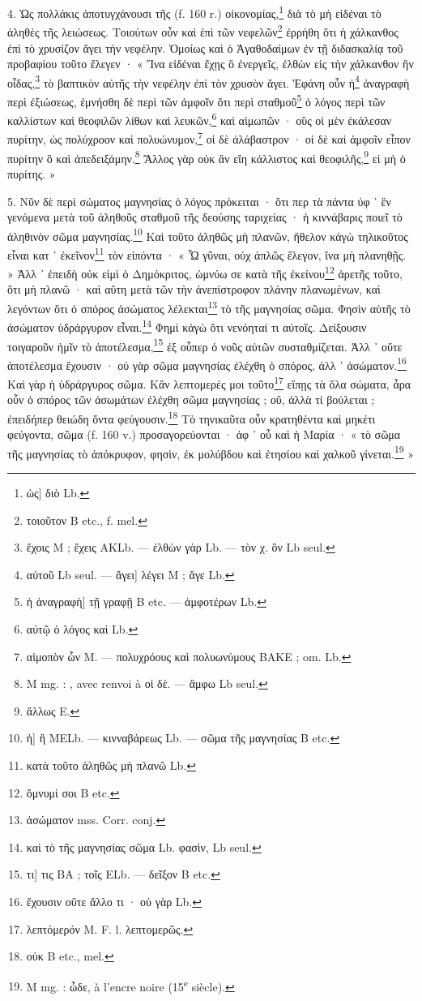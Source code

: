 \documentclass[a4paper, 11pt, oneside, polutonikogreek, french]{article}
\newcommand*\svgA{}
\begin{document}
4. Ὡς πολλάκις ἀποτυγχάνουσι τῆς (f. 160 r.) οἰκονομίας,\footnote{ὡς] διὸ Lb.} διὰ τὸ μὴ εἰδέναι τὸ ἀληθὲς τῆς λειώσεως. Τοιούτων οὖν καὶ ἐπὶ τῶν νεφελῶν\footnote{τοιοῦτον B etc., f. mel.} ἐρρήθη ὅτι ἡ χάλκανθος ἐπὶ τὸ χρυσίζον ἄγει τὴν νεφέλην. Ὁμοίως καὶ ὁ Ἀγαθοδαίμων ἐν τῇ διδασκαλίᾳ τοῦ προβαφίου τοῦτο ἔλεγεν · « Ἵνα εἰδέναι ἔχῃς ὃ ἐνεργεῖς, ἐλθὼν εἰς τὴν χάλκανθον ἣν οἶδας,\footnote{ἔχοις M ; ἔχεις AKLb. --- ἐλθὼν γὰρ Lb. --- τὸν χ. ὃν Lb seul.} τὸ βαπτικὸν αὐτῆς τὴν νεφέλην ἐπὶ τὸν χρυσὸν ἄγει. Ἐφάνη οὖν ἡ\footnote{αὐτοῦ Lb seul. --- ἄγει] λέγει M ; ἄγε Lb.} ἀναγραφὴ περὶ ἐξιώσεως, ἐμνήσθη δὲ περὶ τῶν ἀμφοῖν ὅτι περὶ σταθμοῦ\footnote{ἡ ἀναγραφὴ] τῇ γραφῇ B etc. --- ἀμφοτέρων Lb.} ὁ λόγος περὶ τῶν καλλίστων καὶ θεοφιλῶν λίθων καὶ λευκῶν,\footnote{αύτῷ ὁ λόγος καὶ Lb.} καὶ αἱμωπῶν · οὓς οἱ μὲν ἐκάλεσαν πυρίτην, ὡς πολύχροον καὶ πολυώνυμον,\footnote{αἱμοπὸν ὧν M. --- πολυχρόους καὶ πολυωνύμους BAKE ; om. Lb.} οἱ δὲ ἀλάβαστρον · οἱ δὲ καὶ ἀμφοῖν εἶπον πυρίτην ὃ καὶ ἀπεδειξάμην.\footnote{M mg. : $\svgA$, avec renvoi à οἱ δὲ. --- ἄμφω Lb seul.} Ἄλλος γὰρ οὐκ ἂν εἴη κάλλιστος καὶ θεοφιλῆς,\footnote{ἄλλως E.} εἰ μὴ ὁ πυρίτης. »

5. Νῦν δὲ περὶ σώματος μαγνησίας ὁ λόγος πρόκειται · ὅτι περ τὰ πάντα ὑφ ᾽ ἓν γενόμενα μετὰ τοῦ ἀληθοῦς σταθμοῦ τῆς δεούσης ταριχείας · ἡ κιννάβαρις ποιεῖ τὸ ἀληθινὸν σῶμα μαγνησίας.\footnote{ἡ] ἢ MELb. --- κινναβάρεως Lb. --- σῶμα τῆς μαγνησίας B etc.} Καὶ τοῦτο ἀληθῶς μὴ πλανῶν, ἤθελον κἀγὼ τηλικοῦτος εἶναι κατ ᾽ ἐκεῖνον\footnote{κατὰ τοῦτο ἀληθῶς μὴ πλανῶ Lb.} τὸν εἰπόντα · « Ὦ γῦναι, οὐχ ἁπλῶς ἔλεγον, ἵνα μὴ πλανηθῇς. » Ἀλλ ᾽ ἐπειδὴ οὐκ εἰμὶ ὁ Δημόκριτος, ὠμνύω σε κατὰ τῆς ἐκείνου\footnote{ὄμνυμί σοι B etc.} ἀρετῆς τοῦτο, ὅτι μὴ πλανῶ · καὶ αὕτη μετὰ τῶν τὴν ἀνεπίστροφον πλάνην πλανωμένων, καὶ λεγόντων ὅτι ὁ σπόρος ἀσώματος λέλεκται\footnote{ἀσώματον mss. Corr. conj.} τὸ τῆς μαγνησίας σῶμα. Φησὶν αὐτῆς τὸ ἀσώματον ὑδράργυρον εἶναι.\footnote{καὶ τὸ τῆς μαγνησίας σῶμα Lb. φασὶν, Lb seul.} Φημὶ κἀγὼ ὅτι νενόηταί τι αὐτοῖς. Δείξουσιν τοιγαροῦν ἡμῖν τὸ ἀποτέλεσμα,\footnote{τι] τις BA ; τοῖς ELb. --- δεῖξον B etc.} ἐξ οὗπερ ὁ νοῦς αὐτῶν συσταθμίζεται. Ἀλλ ᾽ οὔτε ἀποτέλεσμα ἔχουσιν · οὐ γὰρ σῶμα μαγνησίας ἐλέχθη ὁ σπόρος, ἀλλ ᾽ ἀσώματον.\footnote{ἔχουσιν οὔτε ἄλλο τι · οὐ γὰρ Lb.} Καὶ γὰρ ἡ ὑδράργυρος σῶμα. Κἂν λεπτομερές μοι τοῦτο\footnote{λεπτόμερόν M. F. l. λεπτομερῶς.} εἴπῃς τὰ ὅλα σώματα, ἆρα οὖν ὁ σπόρος τῶν ἀσωμάτων ἐλέχθη σῶμα μαγνησίας ; οὔ, ἀλλὰ τί βούλεται ; ἐπειδήπερ θειώδη ὄντα φεύγουσιν.\footnote{οὐκ B etc., mel.} Τὸ τηνικαῦτα οὖν κρατηθέντα καὶ μηκέτι φεύγοντα, σῶμα (f. 160 v.) προσαγορεύονται · ἀφ ᾽ οὗ καὶ ἡ Μαρία · « τὸ σῶμα τῆς μαγνησίας τὸ ἀπόκρυφον, φησὶν, ἐκ μολύβδου καὶ ἐτησίου καὶ χαλκοῦ γίνεται.\footnote{M mg. : ὧδε, à l'encre noire (15\textsuperscript{e} siècle).} »
\end{document}
